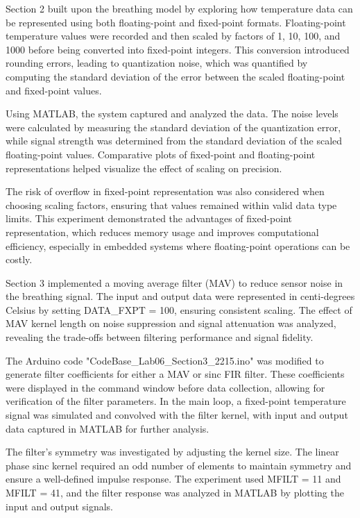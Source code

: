 \documentclass[journal]{IEEEtran}
\begin{document}
Section 2 built upon the breathing model by exploring how temperature data can be represented using both floating-point and fixed-point formats. Floating-point temperature values were recorded and then scaled by factors of 1, 10, 100, and 1000 before being converted into fixed-point integers. This conversion introduced rounding errors, leading to quantization noise, which was quantified by computing the standard deviation of the error between the scaled floating-point and fixed-point values.

Using MATLAB, the system captured and analyzed the data. The noise levels were calculated by measuring the standard deviation of the quantization error, while signal strength was determined from the standard deviation of the scaled floating-point values. Comparative plots of fixed-point and floating-point representations helped visualize the effect of scaling on precision.

The risk of overflow in fixed-point representation was also considered when choosing scaling factors, ensuring that values remained within valid data type limits. This experiment demonstrated the advantages of fixed-point representation, which reduces memory usage and improves computational efficiency, especially in embedded systems where floating-point operations can be costly.

Section 3 implemented a moving average filter (MAV) to reduce sensor noise in the breathing signal. The input and output data were represented in centi-degrees Celsius by setting DATA\_FXPT = 100, ensuring consistent scaling. The effect of MAV kernel length on noise suppression and signal attenuation was analyzed, revealing the trade-offs between filtering performance and signal fidelity.

The Arduino code "CodeBase\_Lab06\_Section3\_2215.ino" was modified to generate filter coefficients for either a MAV or sinc FIR filter. These coefficients were displayed in the command window before data collection, allowing for verification of the filter parameters. In the main loop, a fixed-point temperature signal was simulated and convolved with the filter kernel, with input and output data captured in MATLAB for further analysis.

The filter's symmetry was investigated by adjusting the kernel size. The linear phase sinc kernel required an odd number of elements to maintain symmetry and ensure a well-defined impulse response. The experiment used MFILT = 11 and MFILT = 41, and the filter response was analyzed in MATLAB by plotting the input and output signals.
\end{document}
